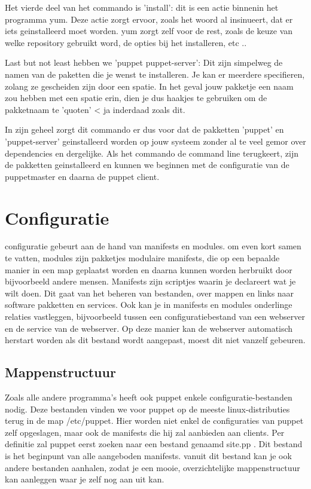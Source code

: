 Het vierde deel van het commando is 'install': dit is een actie binnenin het programma yum. Deze actie zorgt ervoor, zoals het woord al insinueert, dat er iets geinstalleerd moet worden. yum zorgt zelf voor de rest, zoals de keuze van welke repository gebruikt word, de opties bij het installeren, etc ..

Last but not least hebben we 'puppet puppet-server': Dit zijn simpelweg de namen van de paketten die je wenst te installeren. Je kan er meerdere specifieren, zolang ze gescheiden zijn door een spatie. In het geval jouw pakketje een naam zou hebben met een spatie erin, dien je dus haakjes te gebruiken om de pakketnaam te 'quoten' < ja inderdaad zoals dit.

In zijn geheel zorgt dit commando er dus voor dat de pakketten 'puppet' en 'puppet-server' geinstalleerd worden op jouw systeem zonder al te veel gemor over dependencies en dergelijke. Als het commando de command line terugkeert, zijn de pakketten geinstalleerd en kunnen we beginnen met de configuratie van de puppetmaster en daarna de puppet client.


\section{Configuratie}
configuratie gebeurt aan de hand van manifests en modules. om even kort samen te vatten, modules zijn pakketjes modulaire manifests, die op een bepaalde manier in een map geplaatst worden en daarna kunnen worden herbruikt door bijvoorbeeld andere mensen. Manifests zijn scriptjes waarin je declareert wat je wilt doen. Dit gaat van het beheren van bestanden, over mappen en links naar software pakketten en services.
Ook kan je in manifests en modules onderlinge relaties vastleggen, bijvoorbeeld tussen een configuratiebestand van een webserver en de service van de webserver. Op deze manier kan de webserver automatisch herstart worden als dit bestand wordt aangepast, moest dit niet vanzelf gebeuren.

\subsection{Mappenstructuur}
Zoals alle andere programma's heeft ook puppet enkele configuratie-bestanden nodig. Deze bestanden vinden we voor puppet op de meeste linux-distributies terug in de map /etc/puppet. Hier worden niet enkel de configuraties van puppet zelf opgeslagen, maar ook de manifests die hij zal aanbieden aan clients. Per definitie zal puppet eerst zoeken naar een bestand genaamd site.pp . Dit bestand is het beginpunt van alle aangeboden manifests. vanuit dit bestand kan je ook andere bestanden aanhalen, zodat je een mooie, overzichtelijke mappenstructuur kan aanleggen waar je zelf nog aan uit kan.

